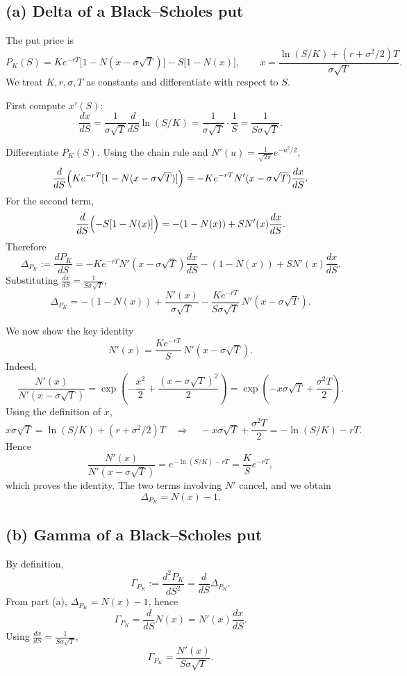 \documentclass{article}
\begin{document}
\subsection*{(a) Delta of a Black--Scholes put}

The put price is
\[
P_K(S)
=
K e^{-rT}\bigl[1-N(x-\sigma\sqrt{T})\bigr]
-
S\bigl[1-N(x)\bigr],
\qquad
x=\frac{\ln(S/K)+(r+\sigma^2/2)T}{\sigma\sqrt{T}}.
\]
We treat \(K,r,\sigma,T\) as constants and differentiate with respect to \(S\).

First compute \(x'(S)\):
\[
\frac{dx}{dS}
=
\frac{1}{\sigma\sqrt{T}}\frac{d}{dS}\ln(S/K)
=
\frac{1}{\sigma\sqrt{T}}\cdot\frac{1}{S}
=
\frac{1}{S\sigma\sqrt{T}}.
\]

Differentiate \(P_K(S)\). Using the chain rule and
\(N'(u)=\frac{1}{\sqrt{2\pi}}e^{-u^2/2}\),
\[
\frac{d}{dS}\Bigl( K e^{-rT}[1-N(x-\sigma\sqrt{T})]\Bigr)
=
- K e^{-rT} N'(x-\sigma\sqrt{T}) \frac{dx}{dS}.
\]
For the second term,
\[
\frac{d}{dS}\Bigl(-S[1-N(x)]\Bigr)
=
-(1-N(x)) + S N'(x)\frac{dx}{dS}.
\]
Therefore
\[
\Delta_{P_K}:=\frac{dP_K}{dS}
=
- K e^{-rT} N'(x-\sigma\sqrt{T}) \frac{dx}{dS}
-(1-N(x)) + S N'(x)\frac{dx}{dS}.
\]
Substituting \(\frac{dx}{dS}=\frac{1}{S\sigma\sqrt{T}}\),
\[
\Delta_{P_K}
=
-(1-N(x))
+\frac{N'(x)}{\sigma\sqrt{T}}
-\frac{K e^{-rT}}{S\sigma\sqrt{T}}\,N'(x-\sigma\sqrt{T}).
\]

We now show the key identity
\[
N'(x)=\frac{K e^{-rT}}{S}\,N'(x-\sigma\sqrt{T}).
\]
Indeed,
\[
\frac{N'(x)}{N'(x-\sigma\sqrt{T})}
=
\exp\!\left(-\frac{x^2}{2}+\frac{(x-\sigma\sqrt{T})^2}{2}\right)
=
\exp\!\left(-x\sigma\sqrt{T}+\frac{\sigma^2T}{2}\right).
\]
Using the definition of \(x\),
\[
x\sigma\sqrt{T}
=
\ln(S/K)+(r+\sigma^2/2)T
\quad\Longrightarrow\quad
-x\sigma\sqrt{T}+\frac{\sigma^2T}{2}
=
-\ln(S/K)-rT.
\]
Hence
\[
\frac{N'(x)}{N'(x-\sigma\sqrt{T})}
=
e^{-\ln(S/K)-rT}
=
\frac{K}{S}e^{-rT},
\]
which proves the identity. The two terms involving \(N'\) cancel, and we obtain
\[
\boxed{\Delta_{P_K}=N(x)-1.}
\]

\subsection*{(b) Gamma of a Black--Scholes put}

By definition,
\[
\Gamma_{P_K}:=\frac{d^2P_K}{dS^2}=\frac{d}{dS}\Delta_{P_K}.
\]
From part (a), \(\Delta_{P_K}=N(x)-1\), hence
\[
\Gamma_{P_K}
=
\frac{d}{dS}N(x)
=
N'(x)\frac{dx}{dS}.
\]
Using \(\frac{dx}{dS}=\frac{1}{S\sigma\sqrt{T}}\),
\[
\boxed{\Gamma_{P_K}=\frac{N'(x)}{S\sigma\sqrt{T}}.}
\]
\end{document}
